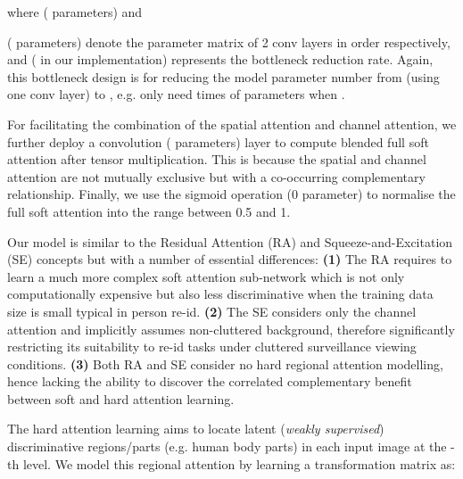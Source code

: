 \documentclass[10pt,twocolumn,letterpaper]{article}
\begin{document}
where  
( parameters) and 
 
( parameters)
denote 
the parameter matrix of 2 conv layers in order respectively,
and  ( in our implementation) represents the bottleneck reduction rate.
Again, this bottleneck design is for reducing the model parameter
number from  (using one conv layer) to ,
e.g. only need  times of parameters when .


For facilitating the combination of the spatial attention and channel attention,
we further deploy  a  convolution ( parameters) layer to compute blended full soft attention after tensor multiplication. This is because the spatial and channel attention are not mutually exclusive but with a co-occurring complementary relationship. Finally, we use the sigmoid operation (0 parameter) to normalise the full soft attention into the range between 0.5 and 1.

\vspace{0.01cm}
Our model is similar to 
the Residual Attention (RA) \cite{wang2017residual}
and Squeeze-and-Excitation (SE)  \cite{hu2017squeeze} concepts
but with a number of essential differences:
{\bf (1)} The RA requires to learn a much more complex soft attention sub-network which is 
not only computationally expensive but also less discriminative when
the training data size is small typical in person re-id.
{\bf (2)} The SE considers only the channel attention and implicitly
assumes non-cluttered background, therefore significantly restricting
its suitability to re-id tasks under
cluttered surveillance viewing conditions.
{\bf (3)} Both RA and SE consider no hard regional attention modelling, 
hence lacking the ability to discover the correlated complementary benefit
between soft and hard attention learning.


\vspace{0.01cm}
The hard attention learning
aims to locate latent ({\em weakly supervised}) discriminative
 regions/parts (e.g. human body parts) in each input image at the -th level.
We model this regional attention by learning a transformation matrix as:
 
\end{document}
